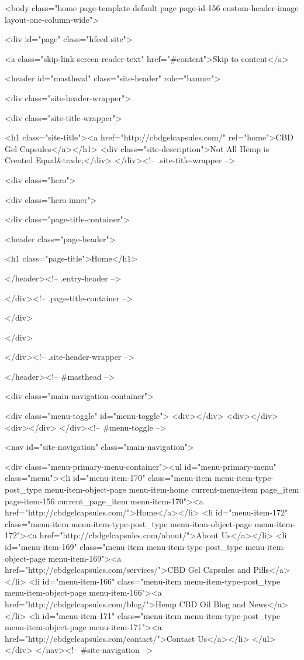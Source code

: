 <body class="home page-template-default page page-id-156 custom-header-image layout-one-column-wide">

	
	<div id="page" class="hfeed site">

		<a class="skip-link screen-reader-text" href="#content">Skip to content</a>

		
		<header id="masthead" class="site-header" role="banner">

			<div class="site-header-wrapper">

				
<div class="site-title-wrapper">

	
	<h1 class="site-title"><a href="http://cbdgelcapsules.com/" rel="home">CBD Gel Capsules</a></h1>
	<div class="site-description">Not All Hemp is Created Equal&trade;</div>
</div><!-- .site-title-wrapper -->

<div class="hero">

	<div class="hero-inner">

		
<div class="page-title-container">

	<header class="page-header">

		
		<h1 class="page-title">Home</h1>

		
	</header><!-- .entry-header -->

</div><!-- .page-title-container -->

	</div>

</div>

			</div><!-- .site-header-wrapper -->

			
		</header><!-- #masthead -->

		
<div class="main-navigation-container">

	
<div class="menu-toggle" id="menu-toggle">
	<div></div>
	<div></div>
	<div></div>
</div><!-- #menu-toggle -->

	<nav id="site-navigation" class="main-navigation">

		<div class="menu-primary-menu-container"><ul id="menu-primary-menu" class="menu"><li id="menu-item-170" class="menu-item menu-item-type-post_type menu-item-object-page menu-item-home current-menu-item page_item page-item-156 current_page_item menu-item-170"><a href="http://cbdgelcapsules.com/">Home</a></li>
<li id="menu-item-172" class="menu-item menu-item-type-post_type menu-item-object-page menu-item-172"><a href="http://cbdgelcapsules.com/about/">About Us</a></li>
<li id="menu-item-169" class="menu-item menu-item-type-post_type menu-item-object-page menu-item-169"><a href="http://cbdgelcapsules.com/services/">CBD Gel Capsules and Pills</a></li>
<li id="menu-item-166" class="menu-item menu-item-type-post_type menu-item-object-page menu-item-166"><a href="http://cbdgelcapsules.com/blog/">Hemp CBD Oil Blog and News</a></li>
<li id="menu-item-171" class="menu-item menu-item-type-post_type menu-item-object-page menu-item-171"><a href="http://cbdgelcapsules.com/contact/">Contact Us</a></li>
</ul></div>
	</nav><!-- #site-navigation -->

